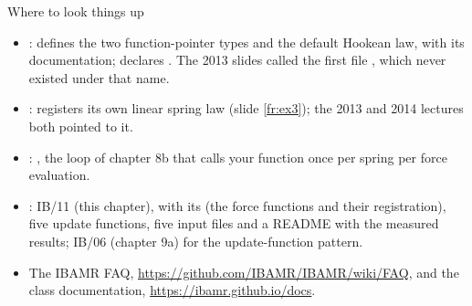 \documentclass[aspectratio=169,11pt]{beamer}
\begin{document}
\begin{frame}{Where to look things up}
\label{fr:lookup}
\small
\begin{itemize}
  \item {}:  defines the two function-pointer types and the default Hookean law, with its documentation;  declares . The 2013 slides called the first file , which never existed under that name.
  \item {}:  registers its own linear spring law (slide \ref{fr:ex3}); the 2013 and 2014 lectures both pointed to it.
  \item {}: , the loop of chapter 8b that calls your function once per spring per force evaluation.
  \item {}: IB/11 (this chapter), with its  (the force functions and their registration), five update functions, five input files and a README with the measured results; IB/06 (chapter 9a) for the update-function pattern.
  \item The IBAMR FAQ, \url{https://github.com/IBAMR/IBAMR/wiki/FAQ}, and the class documentation, \url{https://ibamr.github.io/docs}.
\end{itemize}
\end{frame}
\end{document}
